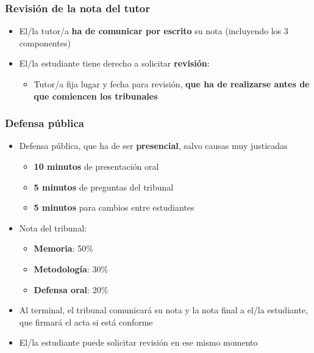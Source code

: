 \documentclass[utf8, xcolor=dvipsnames]{beamer}
\begin{document}
\begin{frame}
\frametitle{Revisión de la nota del tutor}
\centering

\begin{itemize}
  \item El/la tutor/a \textbf{ha de comunicar por escrito} su nota (incluyendo los 3 componentes)
  \item El/la estudiante tiene derecho a solicitar \textbf{revisión}:
  \begin{itemize}
    \item Tutor/a fija lugar y fecha para revisión, \textbf{que ha de realizarse antes de que comiencen los tribunales}
  \end{itemize}
\end{itemize}

\end{frame}

\begin{frame}
\frametitle{Defensa pública}
\centering

\begin{itemize}
  \item Defensa pública, que ha de ser \textbf{presencial}, salvo causas muy justicadas
  \begin{itemize}
    \item \textbf{10 minutos} de presentación oral
    \item \textbf{5 minutos} de preguntas del tribunal
    \item \textbf{5 minutos} para cambios entre estudiantes
  \end{itemize}
  \item Nota del tribunal:
  \begin{itemize}
    \item \textbf{Memoria}: 50\%
    \item \textbf{Metodología}: 30\%
    \item \textbf{Defensa oral}: 20\%
  \end{itemize}
  \item Al terminal, el tribunal comunicará su nota y la nota final a el/la estudiante, que firmará el acta si está conforme
  \item El/la estudiante puede solicitar revisión en ese mismo momento
\end{itemize}

\end{frame}
\end{document}
